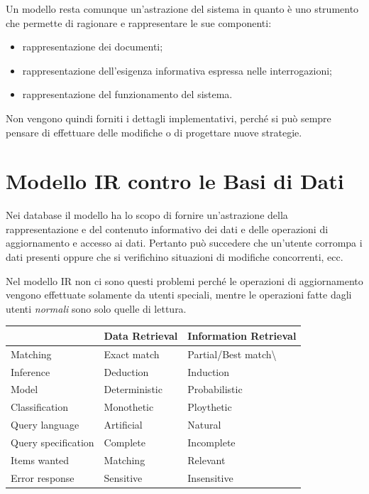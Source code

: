 Un modello resta comunque un'astrazione del sistema in quanto è uno strumento che permette di ragionare e rappresentare le sue componenti:

\begin{itemize}
	\item rappresentazione dei documenti;
	\item rappresentazione dell'esigenza informativa espressa nelle interrogazioni;
	\item rappresentazione del funzionamento del sistema.
\end{itemize}

\noindent Non vengono quindi forniti i dettagli implementativi, perché si può sempre pensare di effettuare delle modifiche o di progettare nuove strategie.

\section{Modello IR contro le Basi di Dati}

Nei database il modello ha lo scopo di fornire un'astrazione della rappresentazione e del contenuto informativo dei dati e delle operazioni di aggiornamento e accesso ai dati.
Pertanto può succedere che un'utente corrompa i dati presenti oppure che si verifichino situazioni di modifiche concorrenti, ecc.

Nel modello IR non ci sono questi problemi perché le operazioni di aggiornamento vengono effettuate solamente da utenti speciali, mentre le operazioni fatte dagli utenti \textit{normali} sono solo quelle di lettura.

\begin{table}[htbp]
	\centering
	\begin{tabular}{l|l|l|}
		\cline{2-3}
		& Data Retrieval & Information Retrieval            \\ \hline
		\multicolumn{1}{|l|}{Matching}            & Exact match    & Partial/Best match\textbackslash \\ \hline
		\multicolumn{1}{|l|}{Inference}           & Deduction      & Induction                        \\ \hline
		\multicolumn{1}{|l|}{Model}               & Deterministic  & Probabilistic                    \\ \hline
		\multicolumn{1}{|l|}{Classification}      & Monothetic     & Ploythetic                       \\ \hline
		\multicolumn{1}{|l|}{Query language}      & Artificial     & Natural                          \\ \hline
		\multicolumn{1}{|l|}{Query specification} & Complete       & Incomplete                       \\ \hline
		\multicolumn{1}{|l|}{Items wanted}        & Matching       & Relevant                         \\ \hline
		\multicolumn{1}{|l|}{Error response}      & Sensitive      & Insensitive                      \\ \hline
	\end{tabular}
\end{table}


